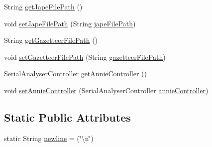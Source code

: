 \begin{DoxyCompactItemize}
\item 
String \hyperlink{classcom_1_1poly_1_1nlp_1_1filekommander_1_1gate_1_1_gate_builder_a2a7ba3b588ceeb7ef77519d399a67524}{get\-Jape\-File\-Path} ()
\item 
void \hyperlink{classcom_1_1poly_1_1nlp_1_1filekommander_1_1gate_1_1_gate_builder_a460d6b7b5460ae3e538ca2e20094507e}{set\-Jape\-File\-Path} (String \hyperlink{classcom_1_1poly_1_1nlp_1_1filekommander_1_1gate_1_1_gate_builder_a58783e8638545aa5ea65a89aa1061dde}{jape\-File\-Path})
\item 
String \hyperlink{classcom_1_1poly_1_1nlp_1_1filekommander_1_1gate_1_1_gate_builder_afa9ffdff61255633b3462963be7c7c3c}{get\-Gazetteer\-File\-Path} ()
\item 
void \hyperlink{classcom_1_1poly_1_1nlp_1_1filekommander_1_1gate_1_1_gate_builder_ae278114910b1abd03a8a5c08b82e864e}{set\-Gazetteer\-File\-Path} (String \hyperlink{classcom_1_1poly_1_1nlp_1_1filekommander_1_1gate_1_1_gate_builder_adceaef80d20a83bd8c1cded83b90a692}{gazetteer\-File\-Path})
\item 
Serial\-Analyser\-Controller \hyperlink{classcom_1_1poly_1_1nlp_1_1filekommander_1_1gate_1_1_gate_builder_a7b004de2eb7ca39b80dd547432c66a3f}{get\-Annie\-Controller} ()
\item 
void \hyperlink{classcom_1_1poly_1_1nlp_1_1filekommander_1_1gate_1_1_gate_builder_a2e9909cef1b22cc5ce8096735b5142d3}{set\-Annie\-Controller} (Serial\-Analyser\-Controller \hyperlink{classcom_1_1poly_1_1nlp_1_1filekommander_1_1gate_1_1_gate_builder_a3801bc53fd7b7449a0aa714ad21bebea}{annie\-Controller})
\end{DoxyCompactItemize}
\subsection*{Static Public Attributes}
\begin{DoxyCompactItemize}
\item 
static String \hyperlink{classcom_1_1poly_1_1nlp_1_1filekommander_1_1gate_1_1_gate_builder_a6a44fefbc1299f76aca84b037f79bd35}{newline} = (\char`\"{}\textbackslash{}n\char`\"{})
\end{DoxyCompactItemize}
